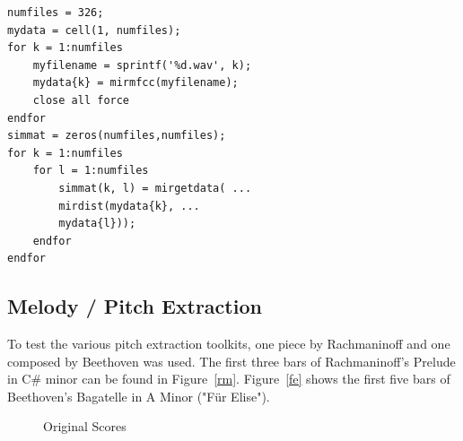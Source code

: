 \lstset{language=Matlab}          %
\FloatBarrier

\begin{lstlisting}[frame=single,label={lst:MIRmat},
caption={MIR Toolkit Similarity},captionpos=b]  % Start your code-block
numfiles = 326;
mydata = cell(1, numfiles);
for k = 1:numfiles
	myfilename = sprintf('%d.wav', k);
	mydata{k} = mirmfcc(myfilename);
	close all force
endfor
simmat = zeros(numfiles,numfiles);
for k = 1:numfiles
	for l = 1:numfiles
		simmat(k, l) = mirgetdata( ...
		mirdist(mydata{k}, ...
		mydata{l}));
	endfor
endfor
\end{lstlisting}
\FloatBarrier

\subsection{Melody / Pitch Extraction}\label{midiest}
To test the various pitch extraction toolkits, one piece by Rachmaninoff and one composed by Beethoven was used. The first three bars of Rachmaninoff's Prelude in C\# minor can be found in Figure~\ref{rm}. Figure~\ref{fe} shows the first five bars of Beethoven's Bagatelle in A Minor ("Für Elise").
\begin{figure}[htbp]
	\centering
	\caption{Original Scores}
	\label{fig:sheets}
\end{figure}
